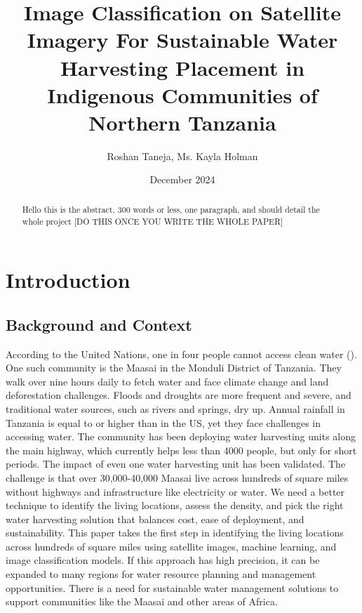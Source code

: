 \documentclass[10pt]{article}
\title{Image Classification on Satellite Imagery For Sustainable Water Harvesting Placement in Indigenous Communities of Northern Tanzania}
\author{Roshan Taneja, Ms. Kayla Holman}
\date{December 2024}
\begin{document}
\maketitle

\begin{abstract}
Hello this is the abstract, 300 words or less, one paragraph, and should detail the whole project [DO THIS ONCE YOU WRITE THE WHOLE PAPER]
\end{abstract}

\section{Introduction}

\subsection{Background and Context}

According to the United Nations, one in four people cannot access clean water (\autocite{United_Nations}). One such community is the Maasai in the Monduli District of Tanzania. They walk over nine hours daily to fetch water and face climate change and land deforestation challenges. Floods and droughts are more frequent and severe, and traditional water sources, such as rivers and springs, dry up. Annual rainfall in Tanzania is equal to or higher than in the US, yet they face challenges in accessing water. The community has been deploying water harvesting units along the main highway, which currently helps less than 4000 people, but only for short periods. The impact of even one water harvesting unit has been validated. The challenge is that over 30,000-40,000 Maasai live across hundreds of square miles without highways and infrastructure like electricity or water. We need a better technique to identify the living locations, assess the density, and pick the right water harvesting solution that balances cost, ease of deployment, and sustainability. This paper takes the first step in identifying the living locations across hundreds of square miles using satellite images, machine learning, and image classification models. If this approach has high precision, it can be expanded to many regions for water resource planning and management opportunities.  There is a need for sustainable water management solutions to support communities like the Maasai and other areas of Africa.
\end{document}
